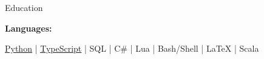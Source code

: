 \documentclass{resume/resume}
\begin{document}
\begin{rSection}{Education}
\begin{adjustwidth}{6em}{0pt}
\end{adjustwidth}

\end{rSection}

%
%   
%
%
%
\vspace{-0.4em}
{\bf Languages:}
\vspace{-1.83em}
\begin{adjustwidth}{6em}{0pt}
  \href{https://github.com/search?q=user\%3ASpelkington+user\%3AUtahTriangle+extension\%3Apy+extension\%3Aipynb&type=Code&ref=advsearch&l=&l=}{Python} |
  \href{https://github.com/search?p=1&q=user\%3ASpelkington+extension\%3Ats+extension\%3Atsx&type=Code}{TypeScript} | 
  SQL |
  C\# |
  Lua | 
  Bash/Shell |
  LaTeX |
  Scala
\end{adjustwidth}
\end{document}
